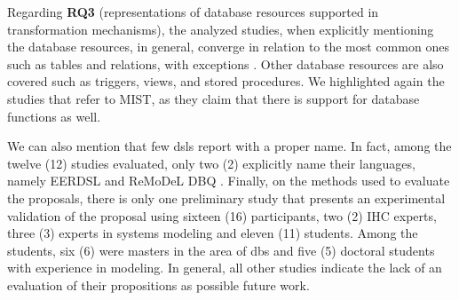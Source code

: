 Regarding \textbf {RQ3} (representations of database resources supported in transformation mechanisms), the analyzed studies, when explicitly mentioning the database resources, in general, converge in relation to the most common ones such as tables and relations, with exceptions \cite{Dey:1999}.
Other database resources are also covered such as triggers, views, and stored procedures.
We highlighted again the studies that refer to MIST, as they claim that there is support for database functions as well.

We can also mention that few \acp{dsl} report with a proper name.
In fact, among the twelve (12) studies evaluated, only two (2) explicitly name their languages, namely EERDSL \cite{Ristic:2016, Dimitrieski:2015, Dimitrieski:2014} and ReMoDeL DBQ \cite{Subahi:2011}.
Finally, on the methods used to evaluate the proposals, there is only one preliminary study that presents an experimental validation of the proposal \cite{Dimitrieski:2015} using sixteen (16) participants, two (2) IHC experts, three (3) experts in systems modeling and eleven (11) students. 
Among the students, six (6) were masters in the area of \acp{db} and five (5) doctoral students with experience in modeling.
In general, all other studies indicate the lack of an evaluation of their propositions as possible future work.

